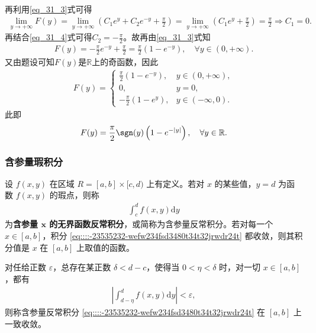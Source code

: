 \documentclass[../../main.tex]{subfiles}%
\begin{document}
\begin{solution}
\begin{enumerate}[(1)]
\begin{align*}
\end{align*}
再利用\eqref{eq_31_3}式可得
\begin{align*}
\lim\limits_{y\to+\infty}F(y)=\lim\limits_{y\to+\infty}\left(C_1e^y+C_2e^{-y}+\frac{\pi}{2}\right)=\lim\limits_{y\to+\infty}\left(C_1e^y+\frac{\pi}{2}\right)=\frac{\pi}{2}\Longrightarrow C_1=0.
\end{align*}
再结合\eqref{eq_31_4}式可得$C_2=-\frac{\pi}{2}$。故再由\eqref{eq_31_3}式知
\begin{align*}
F(y)=-\frac{\pi}{2}e^{-y}+\frac{\pi}{2}=\frac{\pi}{2}(1-e^{-y}),\quad \forall y\in(0,+\infty).
\end{align*}
又由题设可知$F(y)$是$\mathbb{R}$上的奇函数，因此
\begin{align*}
F(y)=
\begin{cases}
\frac{\pi}{2}(1-e^{-y}),&y\in(0,+\infty),\\
0,&y=0,\\
-\frac{\pi}{2}(1-e^y),&y\in(-\infty,0).
\end{cases}
\end{align*}
此即
\begin{align*}
F(y)=\frac{\pi}{2}\sgn(y)\left(1-e^{-|y|}\right),\quad \forall y\in\mathbb{R}.
\end{align*}
\end{enumerate}
\end{solution}






\subsubsection{含参量瑕积分}

\begin{definition}
设 \( f(x,y) \) 在区域 \( R = [a,b] \times [c,d) \) 上有定义。若对 \( x \) 的某些值，\( y = d \) 为函数 \( f(x,y) \) 的瑕点，则称
\begin{align}\label{eq::::-23535232-wefw234fsd3480t34t32jrwdr24t}
\int_{c}^{d} f(x,y) \mathrm{d}y
\end{align}
为\textbf{含参量 \( \boldsymbol{x} \) 的无界函数反常积分}，或简称为含参量反常积分。若对每一个 \( x \in [a,b] \)，积分 \eqref{eq::::-23535232-wefw234fsd3480t34t32jrwdr24t} 都收敛，则其积分值是 \( x \) 在 \( [a,b] \) 上取值的函数。
\end{definition}

\begin{definition}
对任给正数 \( \varepsilon \)，总存在某正数 \( \delta < d - c \)，使得当 \( 0 < \eta < \delta \) 时，对一切 \( x \in [a,b] \)，都有
\begin{align*}
\left| \int_{d - \eta}^{d} f(x,y) \mathrm{d}y \right| < \varepsilon,
\end{align*}
则称含参量反常积分 \eqref{eq::::-23535232-wefw234fsd3480t34t32jrwdr24t} 在 \( [a,b] \) 上一致收敛。
\end{definition}
\end{document}
